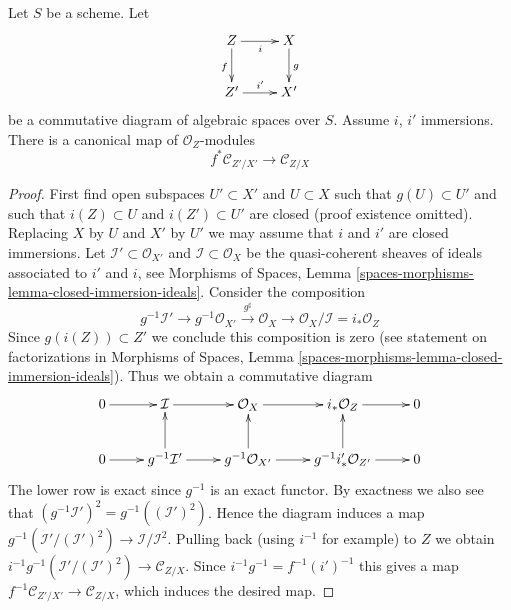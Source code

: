 \begin{lemma}
\label{lemma-conormal-functorial}
Let $S$ be a scheme. Let
$$
\xymatrix{
Z \ar[r]_i \ar[d]_f & X \ar[d]^g \\
Z' \ar[r]^{i'} & X'
}
$$
be a commutative diagram of algebraic spaces over $S$.
Assume $i$, $i'$ immersions. There is a canonical map
of $\mathcal{O}_Z$-modules
$$
f^*\mathcal{C}_{Z'/X'}
\longrightarrow
\mathcal{C}_{Z/X}
$$
\end{lemma}

\begin{proof}
First find open subspaces $U' \subset X'$ and $U \subset X$ such that
$g(U) \subset U'$ and such that $i(Z) \subset U$ and $i(Z') \subset U'$
are closed (proof existence omitted). Replacing $X$ by $U$ and $X'$ by
$U'$ we may assume that $i$ and $i'$ are closed immersions.
Let $\mathcal{I}' \subset \mathcal{O}_{X'}$ and
$\mathcal{I} \subset \mathcal{O}_X$ be the quasi-coherent sheaves of
ideals associated to $i'$ and $i$, see
Morphisms of Spaces, Lemma \ref{spaces-morphisms-lemma-closed-immersion-ideals}.
Consider the composition
$$
g^{-1}\mathcal{I}' \to g^{-1}\mathcal{O}_{X'}
\xrightarrow{g^\sharp} \mathcal{O}_X \to
\mathcal{O}_X/\mathcal{I} = i_*\mathcal{O}_Z
$$
Since $g(i(Z)) \subset Z'$ we conclude this composition is zero (see
statement on factorizations in
Morphisms of Spaces,
Lemma \ref{spaces-morphisms-lemma-closed-immersion-ideals}).
Thus we obtain a commutative diagram
$$
\xymatrix{
0 \ar[r] &
\mathcal{I} \ar[r] &
\mathcal{O}_X \ar[r] &
i_*\mathcal{O}_Z \ar[r] &
0 \\
0 \ar[r] &
g^{-1}\mathcal{I}' \ar[r] \ar[u] &
g^{-1}\mathcal{O}_{X'} \ar[r] \ar[u] &
g^{-1}i'_*\mathcal{O}_{Z'} \ar[r] \ar[u] &
0
}
$$
The lower row is exact since $g^{-1}$ is an exact functor.
By exactness we also see that
$(g^{-1}\mathcal{I}')^2 = g^{-1}((\mathcal{I}')^2)$.
Hence the diagram induces a map
$g^{-1}(\mathcal{I}'/(\mathcal{I}')^2) \to \mathcal{I}/\mathcal{I}^2$.
Pulling back (using $i^{-1}$ for example) to $Z$ we obtain
$i^{-1}g^{-1}(\mathcal{I}'/(\mathcal{I}')^2) \to \mathcal{C}_{Z/X}$.
Since $i^{-1}g^{-1} = f^{-1}(i')^{-1}$ this gives a map
$f^{-1}\mathcal{C}_{Z'/X'} \to \mathcal{C}_{Z/X}$, which induces
the desired map.
\end{proof}

